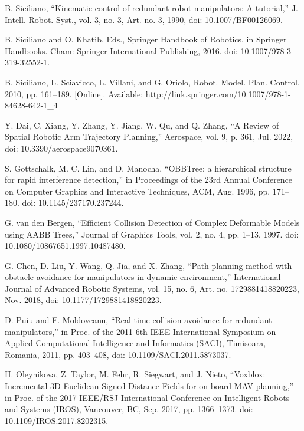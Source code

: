 \documentclass[letterpaper, 10 pt, conference]{ieeeconf}  %
\begin{document}
\begin{thebibliography}{99}
 B. Siciliano, “Kinematic control of redundant robot manipulators: A tutorial,” J. Intell. Robot. Syst., vol. 3, no. 3, Art. no. 3, 1990, doi: 10.1007/BF00126069.

 B. Siciliano and O. Khatib, Eds., Springer Handbook of Robotics, in Springer Handbooks. Cham: Springer International Publishing, 2016. doi: 10.1007/978-3-319-32552-1.

 B. Siciliano, L. Sciavicco, L. Villani, and G. Oriolo, Robot. Model. Plan. Control, 2010, pp. 161–189. [Online]. Available: http://link.springer.com/10.1007/978-1-84628-642-1\_4

 Y. Dai, C. Xiang, Y. Zhang, Y. Jiang, W. Qu, and Q. Zhang, “A Review of Spatial Robotic Arm Trajectory Planning,” Aerospace, vol. 9, p. 361, Jul. 2022, doi: 10.3390/aerospace9070361.

 S. Gottschalk, M. C. Lin, and D. Manocha, “OBBTree: a hierarchical structure for rapid interference detection,” in Proceedings of the 23rd Annual Conference on Computer Graphics and Interactive Techniques, ACM, Aug. 1996, pp. 171–180. doi: 10.1145/237170.237244.

 G. van den Bergen, “Efficient Collision Detection of Complex Deformable Models using AABB Trees,” Journal of Graphics Tools, vol. 2, no. 4, pp. 1–13, 1997. doi: 10.1080/10867651.1997.10487480.

 G. Chen, D. Liu, Y. Wang, Q. Jia, and X. Zhang, “Path planning method with obstacle avoidance for manipulators in dynamic environment,” International Journal of Advanced Robotic Systems, vol. 15, no. 6, Art. no. 1729881418820223, Nov. 2018, doi: 10.1177/1729881418820223.

 D. Puiu and F. Moldoveanu, “Real-time collision avoidance for redundant manipulators,” in Proc. of the 2011 6th IEEE International Symposium on Applied Computational Intelligence and Informatics (SACI), Timisoara, Romania, 2011, pp. 403–408, doi: 10.1109/SACI.2011.5873037.

 H. Oleynikova, Z. Taylor, M. Fehr, R. Siegwart, and J. Nieto, “Voxblox: Incremental 3D Euclidean Signed Distance Fields for on-board MAV planning,” in Proc. of the 2017 IEEE/RSJ International Conference on Intelligent Robots and Systems (IROS), Vancouver, BC, Sep. 2017, pp. 1366–1373. doi: 10.1109/IROS.2017.8202315.


\end{thebibliography}
\end{document}
